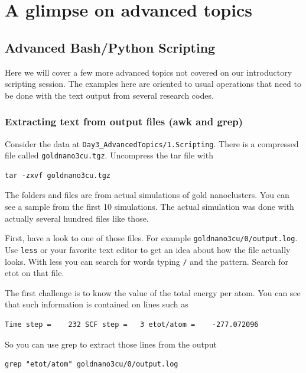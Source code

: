 \chapter{A glimpse on advanced topics}


\section{Advanced Bash/Python Scripting}

Here we will cover a few more advanced topics not covered on our introductory scripting session. The examples here are oriented to usual operations that need to be done with the text output from several research codes.

\subsection{Extracting text from output files (awk and grep)}

Consider the data at \verb|Day3_AdvancedTopics/1.Scripting|.
There is a compressed file called \texttt{goldnano3cu.tgz}.
Uncompress the tar file with

\begin{lstlisting}
tar -zxvf goldnano3cu.tgz
\end{lstlisting}

The folders and files are from actual simulations of gold nanoclusters. You can see a sample from the first 10 simulations. The actual simulation was done with actually several hundred files like those.

First, have a look to one of those files. For example \texttt{goldnano3cu/0/output.log}. Use \texttt{less} or your favorite text editor to get an idea about how the file actually looks. With less you can search for words typing \verb|/| and the pattern. Search for etot on that file.

The first challenge is to know the value of the total energy per atom. You can see that such information is contained on lines such as 

\begin{lstlisting}
Time step =    232 SCF step =   3 etot/atom =    -277.072096
\end{lstlisting}

So you can use grep to extract those lines from the output

\begin{lstlisting}
grep "etot/atom" goldnano3cu/0/output.log
\end{lstlisting}

